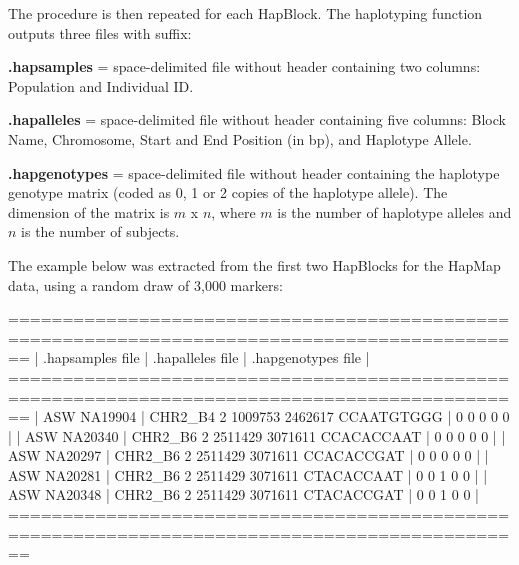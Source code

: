 \documentclass[
]{article}
\newenvironment{Shaded}{}{}
\newcommand{\DecValTok}[1]{#1}
\newcommand{\NormalTok}[1]{#1}
\begin{document}
The procedure is then repeated for each HapBlock. The haplotyping
function outputs three files with suffix:

\textbf{.hapsamples} = space-delimited file without header containing
two columns: Population and Individual ID.

\textbf{.hapalleles} = space-delimited file without header containing
five columns: Block Name, Chromosome, Start and End Position (in bp),
and Haplotype Allele.

\textbf{.hapgenotypes} = space-delimited file without header containing
the haplotype genotype matrix (coded as 0, 1 or 2 copies of the
haplotype allele). The dimension of the matrix is \(m\) x \(n\), where
\(m\) is the number of haplotype alleles and \(n\) is the number of
subjects.

The example below was extracted from the first two HapBlocks for the
HapMap data, using a random draw of 3,000 markers:

\begin{Shaded}
\begin{Highlighting}[]
\NormalTok{==============================================================================================}
\NormalTok{|  .hapsamples file  |            .hapalleles file            |      .hapgenotypes file      |}
\NormalTok{==============================================================================================}
\NormalTok{|     ASW NA19904    |  CHR2_B4 }\DecValTok{2} \DecValTok{1009753} \DecValTok{2462617}\NormalTok{ CCAATGTGGG  |           }\DecValTok{0} \DecValTok{0} \DecValTok{0} \DecValTok{0} \DecValTok{0}\NormalTok{          |}
\NormalTok{|     ASW NA20340    |  CHR2_B6 }\DecValTok{2} \DecValTok{2511429} \DecValTok{3071611}\NormalTok{ CCACACCAAT  |           }\DecValTok{0} \DecValTok{0} \DecValTok{0} \DecValTok{0} \DecValTok{0}\NormalTok{          |}
\NormalTok{|     ASW NA20297    |  CHR2_B6 }\DecValTok{2} \DecValTok{2511429} \DecValTok{3071611}\NormalTok{ CCACACCGAT  |           }\DecValTok{0} \DecValTok{0} \DecValTok{0} \DecValTok{0} \DecValTok{0}\NormalTok{          |}
\NormalTok{|     ASW NA20281    |  CHR2_B6 }\DecValTok{2} \DecValTok{2511429} \DecValTok{3071611}\NormalTok{ CTACACCAAT  |           }\DecValTok{0} \DecValTok{0} \DecValTok{1} \DecValTok{0} \DecValTok{0}\NormalTok{          |}
\NormalTok{|     ASW NA20348    |  CHR2_B6 }\DecValTok{2} \DecValTok{2511429} \DecValTok{3071611}\NormalTok{ CTACACCGAT  |           }\DecValTok{0} \DecValTok{0} \DecValTok{1} \DecValTok{0} \DecValTok{0}\NormalTok{          |}
\NormalTok{==============================================================================================}
\end{Highlighting}
\end{Shaded}
\end{document}
